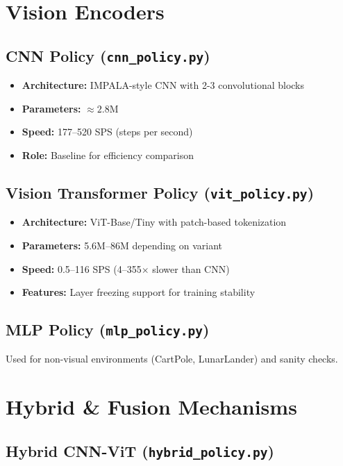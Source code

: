 \documentclass[12pt,a4paper,openany]{report}
\begin{document}
\section{Vision Encoders}

\subsection{CNN Policy (\texttt{cnn\_policy.py})}

\begin{itemize}
    \item \textbf{Architecture:} IMPALA-style CNN with 2-3 convolutional blocks
    \item \textbf{Parameters:} $\approx 2.8\text{M}$
    \item \textbf{Speed:} 177--520 SPS (steps per second)
    \item \textbf{Role:} Baseline for efficiency comparison
\end{itemize}

\subsection{Vision Transformer Policy (\texttt{vit\_policy.py})}

\begin{itemize}
    \item \textbf{Architecture:} ViT-Base/Tiny with patch-based tokenization
    \item \textbf{Parameters:} 5.6M--86M depending on variant
    \item \textbf{Speed:} 0.5--116 SPS (4--355$\times$ slower than CNN)
    \item \textbf{Features:} Layer freezing support for training stability
\end{itemize}

\subsection{MLP Policy (\texttt{mlp\_policy.py})}

Used for non-visual environments (CartPole, LunarLander) and sanity checks.

\section{Hybrid \& Fusion Mechanisms}

\subsection{Hybrid CNN-ViT (\texttt{hybrid\_policy.py})}
\end{document}
